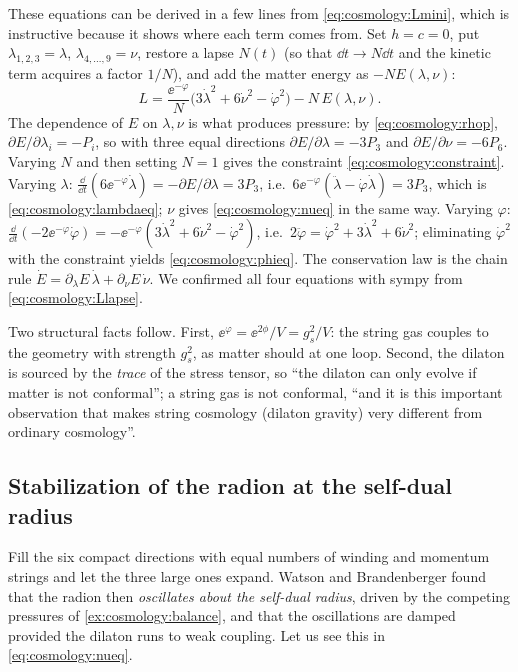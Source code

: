 These equations can be derived in a few lines from \eqref{eq:cosmology:Lmini}, which is
instructive because it shows where each term comes from. Set $h=c=0$, put
$\lambda_{1,2,3}=\lambda$, $\lambda_{4,\dots,9}=\nu$, restore a lapse $N(t)$ (so that
$\dd t\to N\dd t$ and the kinetic term acquires a factor $1/N$), and add the matter energy
as $-NE(\lambda,\nu)$:
\begin{equation}\label{eq:cosmology:Llapse}
 L=\frac{\ee^{-\varphi}}{N}\bigl(3\dot\lambda^2+6\dot\nu^2-\dot\varphi^2\bigr)-N\,E(\lambda,\nu).
\end{equation}
The dependence of $E$ on $\lambda,\nu$ is what produces pressure: by
\eqref{eq:cosmology:rhop}, $\partial E/\partial\lambda_i=-P_i$, so with three equal
directions $\partial E/\partial\lambda=-3P_3$ and $\partial E/\partial\nu=-6P_6$. Varying $N$
and then setting $N=1$ gives the constraint \eqref{eq:cosmology:constraint}. Varying
$\lambda$: $\frac{\dd}{\dd t}(6\ee^{-\varphi}\dot\lambda)=-\partial E/\partial\lambda=3P_3$, i.e.\
$6\ee^{-\varphi}(\ddot\lambda-\dot\varphi\dot\lambda)=3P_3$, which is \eqref{eq:cosmology:lambdaeq};
$\nu$ gives \eqref{eq:cosmology:nueq} in the same way. Varying $\varphi$:
$\frac{\dd}{\dd t}(-2\ee^{-\varphi}\dot\varphi)=-\ee^{-\varphi}(3\dot\lambda^2+6\dot\nu^2-\dot\varphi^2)$,
i.e.\ $2\ddot\varphi=\dot\varphi^2+3\dot\lambda^2+6\dot\nu^2$; eliminating $\dot\varphi^2$ with the
constraint yields \eqref{eq:cosmology:phieq}. The conservation law is the chain rule
$\dot E=\partial_\lambda E\,\dot\lambda+\partial_\nu E\,\dot\nu$. We confirmed all four
equations with sympy from \eqref{eq:cosmology:Llapse}.

Two structural facts follow. First, $\ee^{\varphi}=\ee^{2\phi}/V=g_s^2/V$: the string gas
couples to the geometry with strength $g_s^2$, as matter should at one loop. Second, the
dilaton is sourced by the \emph{trace} of the stress tensor, so ``the dilaton can only
evolve if matter is not conformal''; a string gas is not conformal, ``and it is this
important observation that makes string cosmology (dilaton gravity) very different from
ordinary cosmology''. \source{BW \S IV.B, ll.~1030--1040}

\subsection{Stabilization of the radion at the self-dual radius}

Fill the six compact directions with equal numbers of winding and momentum strings and let
the three large ones expand. Watson and Brandenberger found that the radion then
\emph{oscillates about the self-dual radius}, driven by the competing pressures of
\cref{ex:cosmology:balance}, and that the oscillations are damped provided the dilaton runs
to weak coupling. \source{BW \S IV.C, ll.~1105--1135} Let us see this in
\eqref{eq:cosmology:nueq}.

